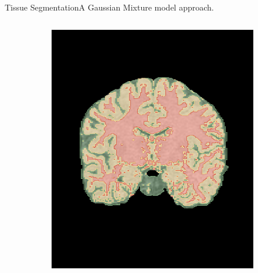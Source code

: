 \documentclass[]{standalone}
\begin{document}
\begin{frame}{Tissue Segmentation}{A Gaussian Mixture model approach.}
\begin{columns}
\begin{column}{0.7\textwidth}
\begin{figure}[h!]
\begin{subfigure}{0.45\textwidth}
					\includegraphics[scale=0.112]{./IMG/segmented_frontal.png}
				\end{subfigure}
				\hspace{15pt}
				\begin{subfigure}{0.45\textwidth}
					

\end{subfigure}
\end{figure}
\end{column}
\end{columns}
\end{frame}
\end{document}
